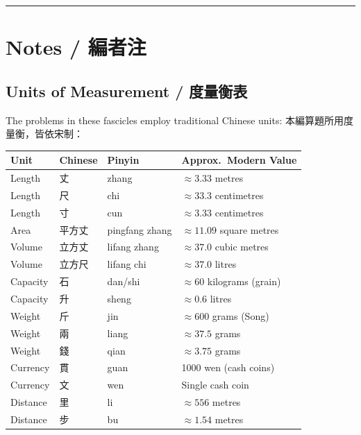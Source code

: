 \documentclass[11pt,a4paper]{article}
\newcommand{\longline}{\noindent\rule{\textwidth}{0.4pt}}
\begin{document}
\vspace{0.5em}
\longline

\newpage
\section*{Notes / 編者注}

\subsection*{Units of Measurement / 度量衡表}

The problems in these fascicles employ traditional Chinese units:
本編算題所用度量衡，皆依宋制：

\vspace{0.5em}

\begin{center}
\begin{longtable}{llll}
\toprule
\textbf{Unit} & \textbf{Chinese} & \textbf{Pinyin} & \textbf{Approx.~Modern Value} \\
\midrule
\endfirsthead
Length & 丈 & zhang & $\approx 3.33$ metres \\
Length & 尺 & chi & $\approx 33.3$ centimetres \\
Length & 寸 & cun & $\approx 3.33$ centimetres \\
Area & 平方丈 & pingfang zhang & $\approx 11.09$ square metres \\
Volume & 立方丈 & lifang zhang & $\approx 37.0$ cubic metres \\
Volume & 立方尺 & lifang chi & $\approx 37.0$ litres \\
Capacity & 石 & dan/shi & $\approx 60$ kilograms (grain) \\
Capacity & 升 & sheng & $\approx 0.6$ litres \\
Weight & 斤 & jin & $\approx 600$ grams (Song) \\
Weight & 兩 & liang & $\approx 37.5$ grams \\
Weight & 錢 & qian & $\approx 3.75$ grams \\
Currency & 貫 & guan & 1000 wen (cash coins) \\
Currency & 文 & wen & Single cash coin \\
Distance & 里 & li & $\approx 556$ metres \\
Distance & 步 & bu & $\approx 1.54$ metres \\
\bottomrule
\end{longtable}
\end{center}
\end{document}
